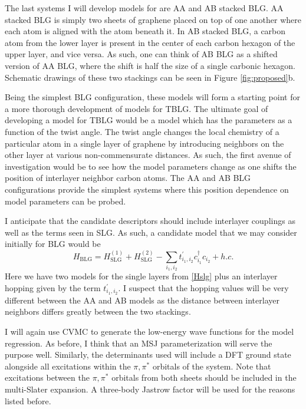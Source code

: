 \documentclass[12pt]{article}
\begin{document}
The last systems I will develop models for are AA and AB stacked BLG.
AA stacked BLG is simply two sheets of graphene placed on top of one another where each atom is aligned with the atom beneath it.
In AB stacked BLG, a carbon atom from the lower layer is present in the center of each carbon hexagon of the upper layer, and vice versa.
As such, one can think of AB BLG as a shifted version of AA BLG, where the shift is half the size of a single carbonic hexagon.
Schematic drawings of these two stackings can be seen in Figure \ref{fig:proposed}b.

Being the simplest BLG configuration, these models will form a starting point for a more thorough development of models for TBLG.
The ultimate goal of developing a model for TBLG would be a model which has the parameters as a function of the twist angle.
The twist angle changes the local chemistry of a particular atom in a single layer of graphene by introducing neighbors on the other layer at various non-commensurate distances.
As such, the first avenue of investigation would be to see how the model parameters change as one shifts the position of interlayer neighbor carbon atoms. 
The AA and AB BLG configurations provide the simplest systems where this position dependence on model parameters can be probed.

I anticipate that the candidate descriptors should include interlayer couplings as well as the terms seen in SLG.
As such, a candidate model that we may consider initially for BLG would be
\begin{equation}
H_\text{BLG} = H_\text{SLG}^{(1)} + H_\text{SLG}^{(2)} - \sum_{i_1, i_2} t_{i_1, i_2}^\prime c_{i_1}^\dagger c_{i_2} + h.c.
\label{Hblg}
\end{equation}
Here we have two models for the single layers from \eqref{Hslg} plus an interlayer hopping given by the term $t_{i_1, i_2}^\prime.$
I suspect that the hopping values will be very different between the AA and AB models as the distance between interlayer neighbors differs greatly between the two stackings.

I will again use CVMC to generate the low-energy wave functions for the model regression.
As before, I think that an MSJ parameterization will serve the purpose well.
Similarly, the determinants used will include a DFT ground state alongside all excitations within the $\pi, \pi^*$ orbitals of the system.
Note that excitations between the $\pi, \pi^*$ orbitals from both sheets should be included in the multi-Slater expansion.
A three-body Jastrow factor will be used for the reasons listed before.
\end{document}
